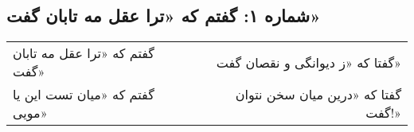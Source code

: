 \begin{center}
\section*{شماره ۱: گفتم که «ترا عقل مه تابان گفت»}
\label{sec:001}
\begin{longtable}{l p{0.5cm} r}
گفتم که «ترا عقل مه تابان گفت»
&&
گفتا که «ز دیوانگی و نقصان گفت»
\\
گفتم که «میان تست این یا مویی»
&&
گفتا که «درین میان سخن نتوان گفت!»
\\
\end{longtable}
\end{center}
